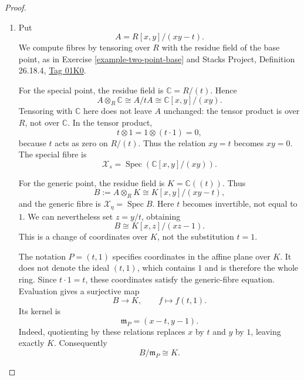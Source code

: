 \begin{proof}
\begin{enumerate}
\item
Put
$$
A=R[x,y]/(xy-t).
$$
We compute fibres by tensoring over
$R$ with the residue field of the
base point, as in Exercise
\ref{example-two-point-base}
and Stacks Project, Definition 26.18.4,
\href{https://stacks.math.columbia.edu/tag/%
01K0}{Tag 01K0}.

For the special point, the residue
field is $\mathbb{C}=R/(t)$. Hence
$$
A\otimes_R\mathbb{C}
\cong A/tA
\cong\mathbb{C}[x,y]/(xy).
$$
Tensoring with $\mathbb{C}$ here does
not leave $A$ unchanged: the tensor
product is over $R$, not over
$\mathbb{C}$. In the tensor product,
$$
t\otimes1=1\otimes(t\cdot1)=0,
$$
because $t$ acts as zero on $R/(t)$.
Thus the relation $xy=t$ becomes
$xy=0$. The special fibre is
$$
\mathcal{X}_s
=\operatorname{Spec}
(\mathbb{C}[x,y]/(xy)).
$$

For the generic point, the residue
field is $K=\mathbb{C}((t))$. Thus
$$
B:=A\otimes_R K
\cong K[x,y]/(xy-t),
$$
and the generic fibre is
$\mathcal{X}_{\eta}=\operatorname{Spec}B$.
Here $t$ becomes invertible, not equal
to $1$. We can nevertheless set
$z=y/t$, obtaining
$$
B\cong K[x,z]/(xz-1).
$$
This is a change of coordinates over
$K$, not the substitution $t=1$.

The notation $P=(t,1)$ specifies
coordinates in the affine plane over
$K$. It does not denote the ideal
$(t,1)$, which contains $1$ and is
therefore the whole ring.
Since $t\cdot1=t$, these coordinates
satisfy the generic-fibre equation.
Evaluation gives a surjective map
$$
B\longrightarrow K,\qquad
f\longmapsto f(t,1).
$$
Its kernel is
$$
\mathfrak{m}_P=(x-t,y-1).
$$
Indeed, quotienting by these relations
replaces $x$ by $t$ and $y$ by $1$,
leaving exactly $K$. Consequently
$$
B/\mathfrak{m}_P\cong K.
$$


\end{enumerate}
\end{proof}
